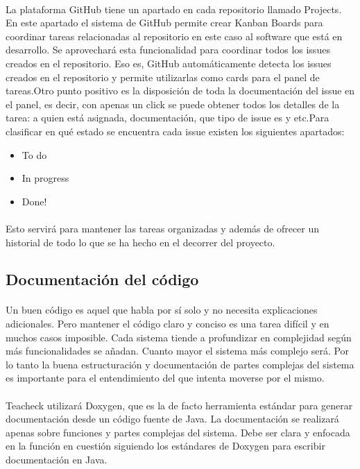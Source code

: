 \paragraph{}
La plataforma GitHub tiene un apartado en cada repositorio llamado
Projects. En este apartado el sistema de GitHub permite crear Kanban
Boards para coordinar tareas relacionadas al repositorio en este caso
al software que está en desarrollo. Se aprovechará esta funcionalidad
para coordinar todos los issues creados en el repositorio. Eso es,
GitHub automáticamente detecta los issues creados en el repositorio y
permite utilizarlas como cards para el panel de tareas.Otro punto
positivo es la disposición de toda la documentación del issue en el
panel, es decir, con apenas un click se puede obtener todos los
detalles de la tarea: a quien está asignada, documentación, que tipo
de issue es y etc.Para clasificar en qué estado se encuentra cada
issue existen los siguientes apartados:

\begin{itemize}
\item
  To do
\item
  In progress
\item
  Done!
\end{itemize}
\paragraph{}
Esto servirá para mantener las tareas organizadas y además de ofrecer
un historial de todo lo que se ha hecho en el decorrer del proyecto.

\subsection{Documentación del código}
\paragraph{}
Un buen código es aquel que habla por sí solo y no necesita
explicaciones adicionales. Pero mantener el código claro y conciso es
una tarea difícil y en muchos casos imposible. Cada sistema tiende a
profundizar en complejidad según más funcionalidades se añadan. Cuanto
mayor el sistema más complejo será. Por lo tanto la buena
estructuración y documentación de partes complejas del sistema es
importante para el entendimiento del que intenta moverse por el mismo.

\paragraph{}
Teacheck utilizará Doxygen, que es la de facto herramienta estándar
para generar documentación desde un código fuente de Java. La
documentación se realizará apenas sobre funciones y partes complejas
del sistema. Debe ser clara y enfocada en la función en cuestión
siguiendo los estándares de Doxygen para escribir documentación en
Java.

